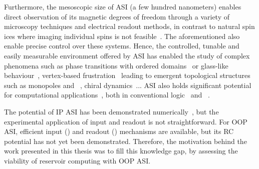Furthermore, the mesoscopic size of ASI (a few hundred nanometers) enables direct observation of its magnetic degrees of freedom through a variety of microscopy techniques and electrical readout methods, in contrast to natural spin ices where imaging individual spins is not feasible~\cite{nisoli2013colloquium,freeman2001advances}.
The aforementioned  also enable precise control over these systems.
Hence, the controlled, tunable and easily measurable environment offered by ASI has enabled the study of complex phenomena such as phase transitions with ordered domains~\cite{ApparentFMpinwheel,sklenar2019field,MeltingASI,ImagingBridgedKagome,sendetskyi2019continuous,lou2023competing,branford2012emerging} or glass-like behaviour~\cite{wang2006artificial,ZeroPointEntropy}, vertex-based frustration~\cite{morrison2013unhappy,nisoli2018topologytetris} leading to emergent topological structures such as monopoles and ~\cite{ObservationMonopoleASI,mengotti2011kagome}, chiral dynamics~\cite{branford2012emerging,EmergentChiralityRatchet}...
ASI also holds significant potential for computational applications~\cite{heyderman2022spin}, both in conventional logic~\cite{ComputationalLogic_2018,Gypens_Balanced,EngineeringRelaxationComputation} and ~\cite{ASI_computation,RC_RecentAdvances}. \par
The  potential of IP ASI has been demonstrated numerically~\cite{RC_ASI}, but the experimental application of input and readout is not straightforward.
For OOP ASI, efficient input () and readout () mechanisms are available, but its RC potential has not yet been demonstrated.
Therefore, the motivation behind the work presented in this thesis was to fill this knowledge gap, by assessing the viability of reservoir computing with OOP ASI.

